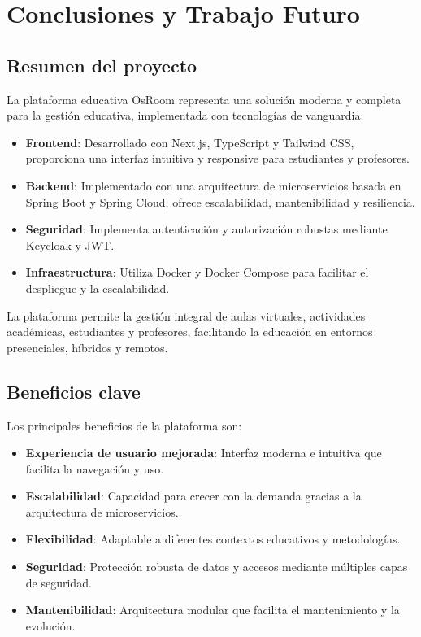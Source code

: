 \documentclass[12pt,a4paper]{report}
\begin{document}
\chapter{Conclusiones y Trabajo Futuro}
\section{Resumen del proyecto}
La plataforma educativa OsRoom representa una solución moderna y completa para la gestión educativa, implementada con tecnologías de vanguardia:

\begin{itemize}
    \item \textbf{Frontend}: Desarrollado con Next.js, TypeScript y Tailwind CSS, proporciona una interfaz intuitiva y responsive para estudiantes y profesores.
    \item \textbf{Backend}: Implementado con una arquitectura de microservicios basada en Spring Boot y Spring Cloud, ofrece escalabilidad, mantenibilidad y resiliencia.
    \item \textbf{Seguridad}: Implementa autenticación y autorización robustas mediante Keycloak y JWT.
    \item \textbf{Infraestructura}: Utiliza Docker y Docker Compose para facilitar el despliegue y la escalabilidad.
\end{itemize}

La plataforma permite la gestión integral de aulas virtuales, actividades académicas, estudiantes y profesores, facilitando la educación en entornos presenciales, híbridos y remotos.

\section{Beneficios clave}
Los principales beneficios de la plataforma son:

\begin{itemize}
    \item \textbf{Experiencia de usuario mejorada}: Interfaz moderna e intuitiva que facilita la navegación y uso.
    \item \textbf{Escalabilidad}: Capacidad para crecer con la demanda gracias a la arquitectura de microservicios.
    \item \textbf{Flexibilidad}: Adaptable a diferentes contextos educativos y metodologías.
    \item \textbf{Seguridad}: Protección robusta de datos y accesos mediante múltiples capas de seguridad.
    \item \textbf{Mantenibilidad}: Arquitectura modular que facilita el mantenimiento y la evolución.
\end{itemize}
\end{document}
